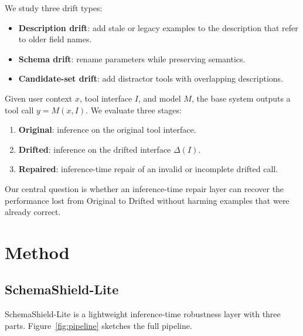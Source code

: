 \documentclass[runningheads]{llncs}
\newcommand{\method}{SchemaShield-Lite\xspace}
\begin{document}
We study three drift types:
\begin{itemize}
\item \textbf{Description drift}: add stale or legacy examples to the description that
refer to older field names.
\item \textbf{Schema drift}: rename parameters while preserving semantics.
\item \textbf{Candidate-set drift}: add distractor tools with overlapping descriptions.
\end{itemize}

Given user context $x$, tool interface $I$, and model $M$, the base system outputs a
tool call $y = M(x, I)$. We evaluate three stages:
\begin{enumerate}
\item \textbf{Original}: inference on the original tool interface.
\item \textbf{Drifted}: inference on the drifted interface $\Delta(I)$.
\item \textbf{Repaired}: inference-time repair of an invalid or incomplete drifted call.
\end{enumerate}

Our central question is whether an inference-time repair layer can recover the
performance lost from Original to Drifted without harming examples that were already
correct.

\section{Method}
\label{sec:method}
\subsection{\method}
\method is a lightweight inference-time robustness layer with three parts.
Figure~\ref{fig:pipeline} sketches the full pipeline.
\end{document}
